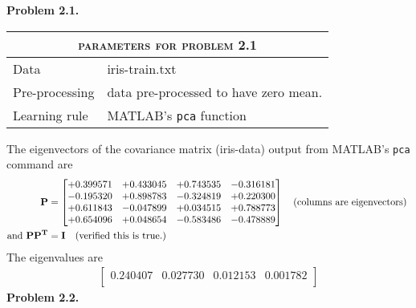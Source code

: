\documentclass[epsfig]{article}
\def\bpar{\vskip26pt}
\def\spar{\vskip10pt}
\begin{document}
\newpage
%
%
%
%
%
%
\clearpage
\bpar
{\bf Problem 2.1.}
\spar
%
%
%
\spar
{
\begin{tabular}{ll}
\hline
\hline
\multicolumn{2}{c}{\textsc{  parameters for problem 2.1}} \\
\hline
\hline
Data                    &     iris-train.txt \\
\hline
Pre-processing    &  data  pre-processed to have zero mean.\\
\hline
Learning rule       & MATLAB's \verb|pca| function\\
\hline
\end{tabular}
}
\spar
The eigenvectors of the covariance matrix (iris-data) output from MATLAB's \verb|pca| command are
\begin{align*}
	{\bf P} &=	\begin{bmatrix}
    					+0.399571 & +0.433045 & +0.743535 & -0.316181  \\
    					-0.195320 & +0.898783 & -0.324819 & +0.220300  \\
    					+0.611843 & -0.047899 & +0.034515 & +0.788773  \\
    					+0.654096 & +0.048654 & -0.583486 & -0.478889  \\
			\end{bmatrix} \text{\quad (columns are eigenvectors) }\\
 \text{and } {\bf PP^T} &= {\bf I}  \text{\quad (verified this is true.) }
\end{align*}
\spar
The eigenvalues are
\begin{align*}
	\begin{bmatrix}
		0.240407  & 0.027730 & 0.012153  & 0.001782 \\
	\end{bmatrix}
\end{align*}
\newpage
%
%
%
%
%
%
\clearpage
\bpar
{\bf Problem 2.2.}
\spar
%
%
%
\spar
\end{document}
